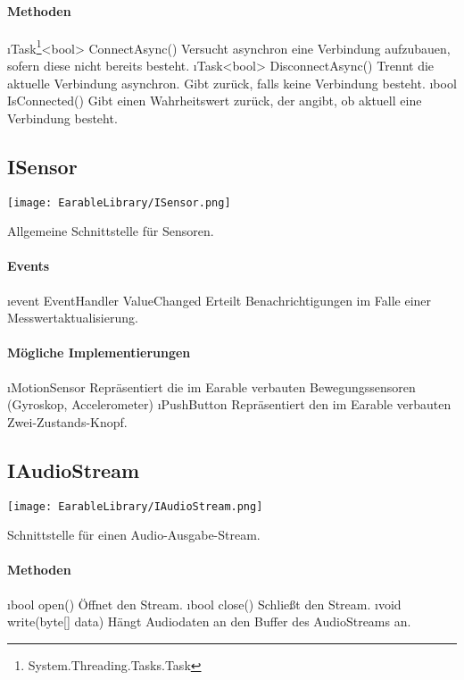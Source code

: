 \documentclass[../entwurf.tex]{subfiles}
\begin{document}
\paragraph{Methoden}
\begin{itemize}
	\i{Task\footnote{System.Threading.Tasks.Task}<bool> ConnectAsync()} Versucht asynchron eine Verbindung aufzubauen, sofern diese nicht bereits besteht.
	\i{Task<bool> DisconnectAsync()} Trennt die aktuelle Verbindung asynchron. Gibt  zurück, falls keine Verbindung besteht.
	\i{bool IsConnected()} Gibt einen Wahrheitswert zurück, der angibt, ob aktuell eine Verbindung besteht.
\end{itemize}

\subsection{ISensor}
\begin{center}
	\texttt{[image: EarableLibrary/ISensor.png]}
\end{center}
Allgemeine Schnittstelle für Sensoren.
\paragraph{Events}
\begin{itemize}
	\i{event EventHandler ValueChanged} Erteilt Benachrichtigungen im Falle einer Messwertaktualisierung.
\end{itemize}
\paragraph{Mögliche Implementierungen}
\begin{itemize}
	\i{MotionSensor} Repräsentiert die im Earable verbauten Bewegungssensoren (Gyroskop, Accelerometer)
	\i{PushButton} Repräsentiert den im Earable verbauten Zwei-Zustands-Knopf.
\end{itemize}

\subsection{IAudioStream}
\begin{center}
	\texttt{[image: EarableLibrary/IAudioStream.png]}
\end{center}
Schnittstelle für einen Audio-Ausgabe-Stream.
\paragraph{Methoden}
\begin{itemize}
	\i{bool open()} Öffnet den Stream.
	\i{bool close()} Schließt den Stream.
	\i{void write(byte[] data)} Hängt Audiodaten an den Buffer des AudioStreams an.
\end{itemize}
\end{document}
